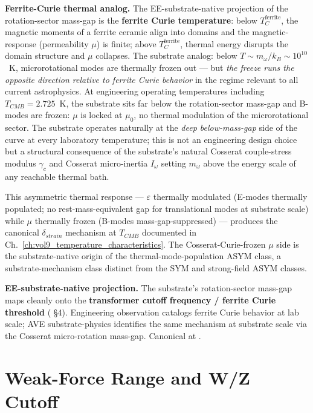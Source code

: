\textbf{Ferrite-Curie thermal analog.} The EE-substrate-native projection of the rotation-sector mass-gap is the \textbf{ferrite Curie temperature}: below $T_C^{\text{ferrite}}$, the magnetic moments of a ferrite ceramic align into domains and the magnetic-response (permeability $\mu$) is finite; above $T_C^{\text{ferrite}}$, thermal energy disrupts the domain structure and $\mu$ collapses. The substrate analog: below $T \sim m_\omega/k_B \sim 10^{10}$~K, microrotational modes are thermally frozen out --- but \emph{the freeze runs the opposite direction relative to ferrite Curie behavior} in the regime relevant to all current astrophysics. At engineering operating temperatures including $T_{CMB} = 2.725$~K, the substrate sits far below the rotation-sector mass-gap and B-modes are frozen: $\mu$ is locked at $\mu_0$, no thermal modulation of the microrotational sector. The substrate operates naturally at the \emph{deep below-mass-gap} side of the curve at every laboratory temperature; this is not an engineering design choice but a structural consequence of the substrate's natural Cosserat couple-stress modulus $\gamma_c$ and Cosserat micro-inertia $I_\omega$ setting $m_\omega$ above the energy scale of any reachable thermal bath.

This asymmetric thermal response --- $\varepsilon$ thermally modulated (E-modes thermally populated; no rest-mass-equivalent gap for translational modes at substrate scale) while $\mu$ thermally frozen (B-modes mass-gap-suppressed) --- produces the canonical $\delta_{strain}$ mechanism at $T_{CMB}$ documented in Ch.~\ref{ch:vol9_temperature_characteristics}. The Cosserat-Curie-frozen $\mu$ side is the substrate-native origin of the thermal-mode-population ASYM class, a substrate-mechanism class distinct from the SYM and strong-field ASYM classes.

\textbf{EE-substrate-native projection.} The substrate's rotation-sector mass-gap maps cleanly onto the \textbf{transformer cutoff frequency / ferrite Curie threshold} ( \S 4). Engineering observation catalogs ferrite Curie behavior at lab scale; AVE substrate-physics identifies the same mechanism at substrate scale via the Cosserat micro-rotation mass-gap. Canonical at .

\section{Weak-Force Range and W/Z Cutoff}
\label{sec:vol9_weak_force_range_wz_cutoff}

